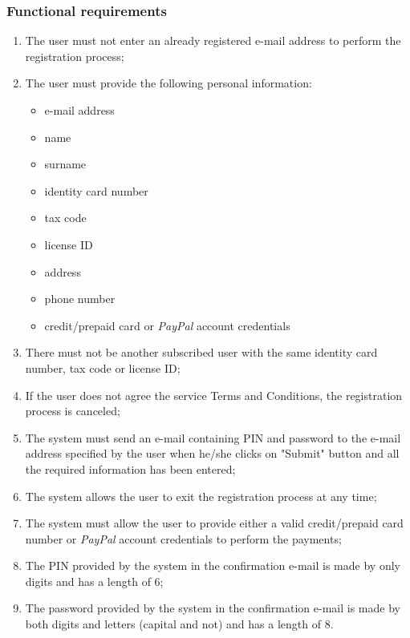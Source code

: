\subsubsection{Functional requirements}
\begin{enumerate}
\item The user must not enter an already registered e-mail address to perform the registration process;
\item The user must provide the following personal information:
	\begin{itemize}
	\item e-mail address
	\item name
	\item surname
	\item identity card number
	\item tax code
	\item license ID
	\item address
	\item phone number
	\item credit/prepaid card or \emph{PayPal} account credentials
	\end{itemize}
\item There must not be another subscribed user with the same identity card number, tax code or license ID;
\item If the user does not agree the service Terms and Conditions, the registration process is canceled;
\item The system must send an e-mail containing PIN and password to the e-mail address specified by the user when he/she clicks on "Submit" button and all the required information has been entered;
\item The system allows the user to exit the registration process at any time;
\item The system must allow the user to provide either a valid credit/prepaid card number or \emph{PayPal} account credentials to perform the payments;
\item The PIN provided by the system in the confirmation e-mail is made by only digits and has a length of 6;
\item The password provided by the system in the confirmation e-mail is made by both digits and letters (capital and not) and has a length of 8.
\end{enumerate}